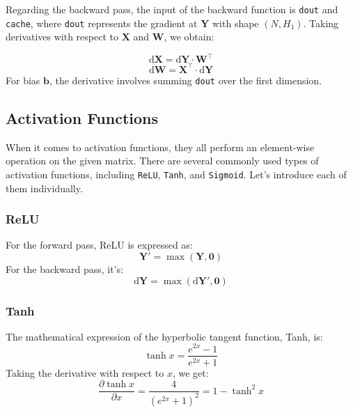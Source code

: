 \documentclass[10pt,a4paper,twoside]{tau}
\renewcommand{\vec}[1]{\mathbf{#1}}
\renewcommand{\d}{\text{d}}
\begin{document}
Regarding the backward pass, the input of the backward function is \texttt{dout} and \texttt{cache}, where \texttt{dout} represents the gradient at $\vec{Y}$ with shape $(N, H_1)$. Taking derivatives with respect to $\vec{X}$ and $\vec{W}$, we obtain:

\begin{equation}
    \d\vec{X} = \d\vec{Y} \cdot \vec{W}^{\top} \tag{3.1.2}
\end{equation}
\begin{equation}
    \d\vec{W} = \vec{X}^{\top} \cdot \d\vec{Y} \tag{3.1.3}
\end{equation}
For bias $\vec{b}$, the derivative involves summing \texttt{dout} over the first dimension. 


\subsection{Activation Functions}

When it comes to activation functions, they all perform an element-wise operation on the given matrix. There are several commonly used types of activation functions, including \texttt{ReLU}, \texttt{Tanh}, and \texttt{Sigmoid}. Let's introduce each of them individually.

\subsubsection{ReLU}

For the forward pass, ReLU is expressed as:
\begin{equation}
\vec{Y'} = \max(\vec{Y}, \vec{0}) \tag{3.2.1}
\end{equation}
For the backward pass, it's:
\begin{equation}
\d\vec{Y} = \max(\d\vec{Y'}, \vec{0}) \tag{3.2.2}
\end{equation}

\subsubsection{Tanh}

The mathematical expression of the hyperbolic tangent function, Tanh, is:
\begin{equation}
\tanh{x} = \frac{e^{2x} - 1}{e^{2x} + 1} \tag{3.2.3}
\end{equation}
Taking the derivative with respect to $x$, we get:
\begin{equation}
\frac{\partial \tanh{x}}{\partial x} = \frac{4}{(e^{2x}+1)^2} = 1 - \tanh^2{x} \tag{3.2.4}
\end{equation}
\end{document}
